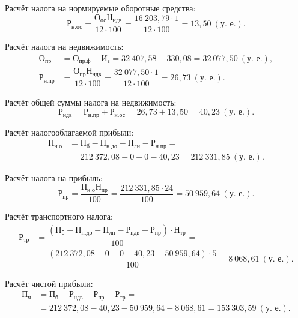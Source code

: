 Расчёт налога на нормируемые оборотные средства:
\begin{equation*}
  \text{Р}_{\text{н.ос}} =
  \dfrac{\text{О}_{\text{ос}} \text{Н}_{\text{ндв}}}{12 \cdot 100} =
  \dfrac{16~203{,}79 \cdot 1}{12 \cdot 100} = 13{,}50 ~ (\text{у.~е.}).
\end{equation*}

Расчёт налога на недвижимость:
\begin{align*}
  \text{О}_{\text{пр}} &= \text{О}_{\text{пр.ф}} - \text{И}_{\text{з}} =
  32~407{,}58 - 330{,}08 = 32~077{,}50 ~ (\text{у.~е.}), \\
  \text{Р}_{\text{н.пр}} &=
  \dfrac{\text{О}_{\text{пр}} \text{Н}_{\text{ндв}}}{12 \cdot 100} =
  \dfrac{32~077{,}50 \cdot 1}{12 \cdot 100} =
  26{,}73~(\text{у.~е.}).
\end{align*}

Расчёт общей суммы налога на недвижимость:
\begin{equation*}
  \text{Р}_{\text{ндв}} = \text{Р}_{\text{н.пр}} + \text{Р}_{\text{н.ос}} =
  26{,}73 + 13{,}50 = 40{,}23~(\text{у.~е.}).
\end{equation*}

Расчёт налогооблагаемой прибыли:
\begin{align*}
  \text{П}_{\text{н.о}} &= \text{П}_{\text{б}} -
  \text{П}_{\text{н.до}} - \text{П}_{\text{лн}} - \text{Р}_{\text{н.пр}} = \\
  &= 212~372{,}08 - 0 - 0 - 40{,}23 = 212~331{,}85~(\text{у.~е.}).
\end{align*}

Расчёт налога на прибыль:
\begin{equation*}
  \text{Р}_{\text{пр}} =
  \dfrac{\text{П}_{\text{н.о}} \text{Н}_{\text{пр}}}{100} =
  \dfrac{212~331{,}85 \cdot 24}{100} =
  50~959{,}64~(\text{у.~е.}).
\end{equation*}

Расчёт транспортного налога:
\begin{align*}
  \text{Р}_{\text{тр}} &=
  \dfrac{
    (\text{П}_{\text{б}} - \text{П}_{\text{н.до}} - \text{П}_{\text{лн}} -
    \text{Р}_{\text{ндв}} - \text{Р}_{\text{пр}}) \cdot \text{Н}_{\text{тр}}
  }{100} = \\
  &= \dfrac{(212~372{,}08 - 0 - 0 - 40{,}23 - 50~959{,}64) \cdot 5}{100} =
  8~068{,}61~(\text{у.~е.}).
\end{align*}

Расчёт чистой прибыли:
\begin{align*}
  \text{П}_{\text{ч}} &= \text{П}_{\text{б}} -
  \text{Р}_{\text{ндв}} - \text{Р}_{\text{пр}}  - \text{Р}_{\text{тр}} = \\
  &= 212~372{,}08 - 40{,}23 - 50~959{,}64 - 8~068{,}61 = 153~303{,}59~(\text{у.~е.}).
\end{align*}

